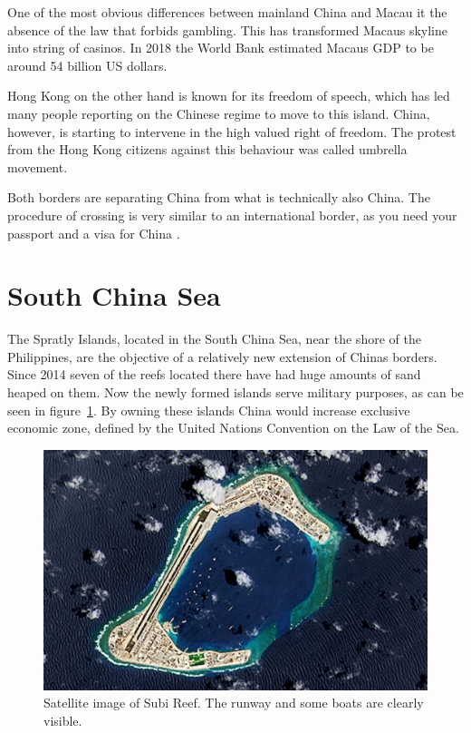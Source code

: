 \documentclass[conference]{IEEEtran}
\begin{document}
	One of the most obvious differences between mainland China and Macau it the absence of the law that forbids gambling. This has transformed Macaus skyline into string of casinos. In 2018 the World Bank estimated Macaus GDP to be around 54 billion US dollars.
	
	Hong Kong on the other hand is known for its freedom of speech, which has led many people reporting on the Chinese regime to move to this island. China, however, is starting to intervene in the high valued right of freedom. The protest from the Hong Kong citizens against this behaviour was called umbrella movement.
	
	Both borders are separating China from what is technically also China. The procedure of crossing is very similar to an international border, as you need your passport and a visa for China\cite{macauLifestyle_macauZhuhaiTheUltimateBorderCrossingGuide} \cite{yp_chinaIsErasingItsBorderWithHongKong}.
	
	\section{South China Sea}
	The Spratly Islands, located in the South China Sea, near the shore of the Philippines, are the objective of a relatively new extension of Chinas borders. Since 2014 seven of the reefs located there have had huge amounts of sand heaped on them. Now the newly formed islands serve military purposes, as can be seen in figure~\ref{pic:southChinaSea_subiReef}. By owning these islands China would increase exclusive economic zone, defined by the United Nations Convention on the Law of the Sea\cite{unitedNations_lawOfTheSea}.
	
	\begin{figure}[t]
		\centering
		\includegraphics[width=\linewidth]{img/southChinaSea_subiReef.jpg}
		\caption{Satellite image of Subi Reef\cite{theTelegraph_chinaLandsMilitaryPlaneAtThirdSpratlyIsland}. The runway and some boats are clearly visible.}
		\label{pic:southChinaSea_subiReef}
	\end{figure}
	
\end{document}
